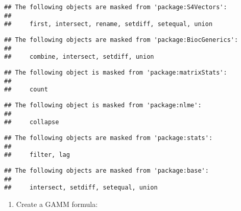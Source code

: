 \documentclass[
]{article}
\providecommand{\tightlist}{%
  \setlength{\itemsep}{0pt}\setlength{\parskip}{0pt}}
\begin{document}
\begin{verbatim}
## The following objects are masked from 'package:S4Vectors':
## 
##     first, intersect, rename, setdiff, setequal, union
\end{verbatim}

\begin{verbatim}
## The following objects are masked from 'package:BiocGenerics':
## 
##     combine, intersect, setdiff, union
\end{verbatim}

\begin{verbatim}
## The following object is masked from 'package:matrixStats':
## 
##     count
\end{verbatim}

\begin{verbatim}
## The following object is masked from 'package:nlme':
## 
##     collapse
\end{verbatim}

\begin{verbatim}
## The following objects are masked from 'package:stats':
## 
##     filter, lag
\end{verbatim}

\begin{verbatim}
## The following objects are masked from 'package:base':
## 
##     intersect, setdiff, setequal, union
\end{verbatim}

\begin{enumerate}
\def\labelenumi{\arabic{enumi}.}
\tightlist
\item
  Create a GAMM formula:
\end{enumerate}
\end{document}
